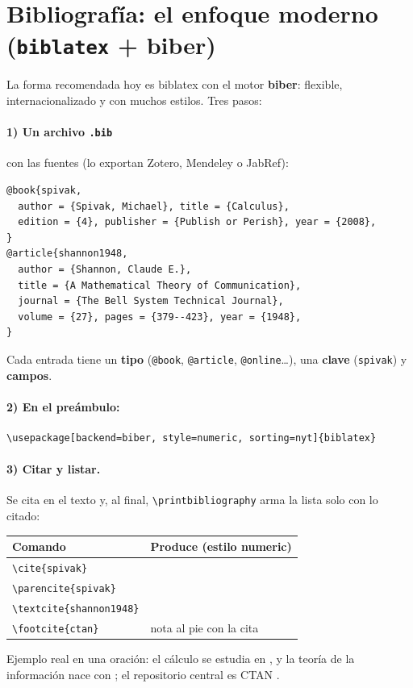 \documentclass[11pt,a4paper]{article}
\newcommand{\C}[1]{\texttt{\textbackslash #1}}
\newcommand{\pkg}[1]{\textsf{#1}}
\begin{document}
\section{Bibliografía: el enfoque moderno (\texttt{biblatex} + biber)}
La forma recomendada hoy es \pkg{biblatex} con el motor \textbf{biber}: flexible,
internacionalizado y con muchos estilos. Tres pasos:

\paragraph{1) Un archivo \texttt{.bib}} con las fuentes (lo exportan Zotero,
Mendeley o JabRef):
\begin{lstlisting}
@book{spivak,
  author = {Spivak, Michael}, title = {Calculus},
  edition = {4}, publisher = {Publish or Perish}, year = {2008},
}
@article{shannon1948,
  author = {Shannon, Claude E.},
  title = {A Mathematical Theory of Communication},
  journal = {The Bell System Technical Journal},
  volume = {27}, pages = {379--423}, year = {1948},
}
\end{lstlisting}
Cada entrada tiene un \textbf{tipo} (\texttt{@book}, \texttt{@article},
\texttt{@online}\dots), una \textbf{clave} (\texttt{spivak}) y \textbf{campos}.

\paragraph{2) En el preámbulo:}
\begin{lstlisting}
\usepackage[backend=biber, style=numeric, sorting=nyt]{biblatex}

\end{lstlisting}

\paragraph{3) Citar y listar.} Se cita en el texto y, al final, \C{printbibliography}
arma la lista solo con lo citado:
\begin{center}\small
\renewcommand{\arraystretch}{1.25}
\begin{tabular}{@{}ll@{}}
\toprule
\textbf{Comando} & \textbf{Produce (estilo numeric)} \\
\midrule
\C{cite\{spivak\}}      & \cite{spivak} \\
\C{parencite\{spivak\}} & \parencite{spivak} \\
\C{textcite\{shannon1948\}} & \textcite{shannon1948} \\
\C{footcite\{ctan\}}    & nota al pie con la cita \\
\bottomrule
\end{tabular}
\end{center}
\noindent Ejemplo real en una oración: el cálculo se estudia en \textcite{spivak},
y la teoría de la información nace con \textcite{shannon1948}; el repositorio
central es CTAN \parencite{ctan}.
\end{document}
